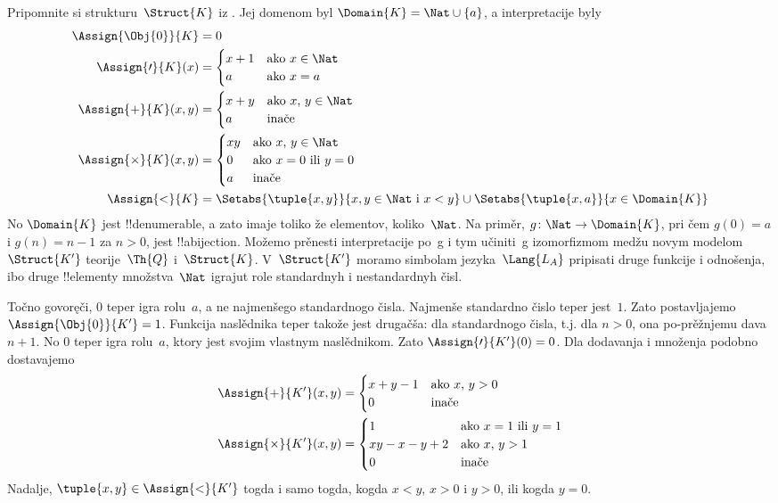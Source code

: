 \documentclass[../../../include/open-logic-section]{subfiles}
\begin{document}
\begin{ex}
Pripomnite si strukturu~$\Struct{K}$ iz
. Jej domenom byl $\Domain{K} = \Nat
\cup \{a\}$, a interpretacije byly
\begin{align*}
  \Assign{\Obj{0}}{K} & = 0\\
  \Assign{\prime}{K}(x) & =
  \begin{cases}
    x+1 & \text{ako $x\in \Nat$}\\
    a & \text{ako $x = a$}
  \end{cases}\\
  \Assign{+}{K}(x, y) & =
  \begin{cases}
    x+y & \text{ako $x$, $y \in\Nat$}\\
    a & \text{inače}
  \end{cases}\\
  \Assign{\times}{K}(x, y) & =
  \begin{cases}
    xy & \text{ako $x$, $y \in\Nat$}\\
    0 & \text{ako $x=0$ ili $y=0$}\\
    a & \text{inače}\\
  \end{cases}\\
  \Assign{<}{K} & =
  \Setabs{\tuple{x,y}}{x, y \in \Nat \text{ i } x<y} \cup
  \Setabs{\tuple{x,a}}{x \in \Domain{K}}
\end{align*}
No $\Domain{K}$ jest !!{denumerable}, a zato imaje toliko že elementov,
koliko~$\Nat$. Na priměr, $g\colon \Nat \to \Domain{K}$, pri čem $g(0) =
a$ i $g(n) = n-1$ za $n>0$, jest !!a{bijection}. Možemo prěnesti
interpretacije po~g i tym učiniti~g izomorfizmom medžu novym
modelom~$\Struct{K'}$ teorije~$\Th{Q}$ i~$\Struct{K}$. V~$\Struct{K'}$
moramo simbolam jezyka~$\Lang{L_A}$ pripisati druge funkcije i
odnošenja, ibo druge !!{element}y množstva~$\Nat$ igrajut role
standardnyh i nestandardnyh čisl.

Točno govoręči, $0$ teper igra rolu~$a$, a ne najmenšego standardnogo
čisla. Najmenše standardno čislo teper jest~$1$. Zato postavljajemo
$\Assign{\Obj{0}}{K'} = 1$. Funkcija naslědnika teper takože jest
drugačša: dla standardnogo čisla, t.j. dla $n > 0$, ona po-prěžnjemu
dava $n+1$. No $0$ teper igra rolu~$a$, ktory jest svojim vlastnym
naslědnikom. Zato $\Assign{\prime}{K'}(0) = 0$. Dla dodavanja i
množenja podobno dostavajemo
\begin{align*}
\Assign{+}{K'}(x, y) & =
  \begin{cases}
    x+y-1 & \text{ako $x$, $y >0$}\\
    0 & \text{inače}
  \end{cases}\\
  \Assign{\times}{K'}(x, y) & =
  \begin{cases}
    1 & \text{ako $x = 1$ ili $y = 1$}\\
    xy - x - y + 2 & \text{ako $x$, $y > 1$}\\
    0 & \text{inače}\\
  \end{cases}
\end{align*}
Nadalje, $\tuple{x, y} \in \Assign{<}{K'}$ togda i samo togda, kogda
$x < y$, $x > 0$ i $y > 0$, ili kogda $y = 0$.


\end{ex}
\end{document}
